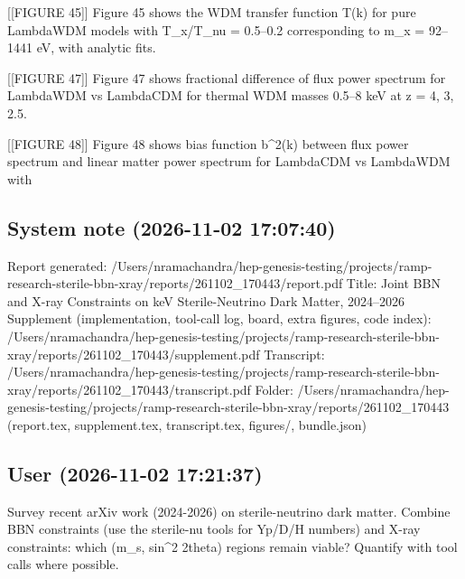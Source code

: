 \documentclass[11pt,a4paper]{article}
\begin{document}
[[FIGURE 45]] Figure 45 shows the WDM transfer function T(k) for pure LambdaWDM models with T\_x/T\_nu = 0.5--0.2 corresponding to m\_x = 92--1441 eV, with analytic fits.

[[FIGURE 47]] Figure 47 shows fractional difference of flux power spectrum for LambdaWDM vs LambdaCDM for thermal WDM masses 0.5--8 keV at z = 4, 3, 2.5.

[[FIGURE 48]] Figure 48 shows bias function b\textasciicircum{}2(k) between flux power spectrum and linear matter power spectrum for LambdaCDM vs LambdaWDM with

\subsection*{System note \small(2026-11-02 17:07:40)}
Report generated: /Users/nramachandra/hep-genesis-testing/projects/ramp-research-sterile-bbn-xray/reports/261102\_170443/report.pdf Title: Joint BBN and X-ray Constraints on keV Sterile-Neutrino Dark Matter, 2024--2026 Supplement (implementation, tool-call log, board, extra figures, code index): /Users/nramachandra/hep-genesis-testing/projects/ramp-research-sterile-bbn-xray/reports/261102\_170443/supplement.pdf Transcript: /Users/nramachandra/hep-genesis-testing/projects/ramp-research-sterile-bbn-xray/reports/261102\_170443/transcript.pdf Folder: /Users/nramachandra/hep-genesis-testing/projects/ramp-research-sterile-bbn-xray/reports/261102\_170443 (report.tex, supplement.tex, transcript.tex, figures/, bundle.json)

\subsection*{User \small(2026-11-02 17:21:37)}
Survey recent arXiv work (2024-2026) on sterile-neutrino dark matter. Combine BBN constraints (use the sterile-nu tools for Yp/D/H numbers) and X-ray constraints: which (m\_s, sin\textasciicircum{}2 2theta) regions remain viable? Quantify with tool calls where possible.
\end{document}
